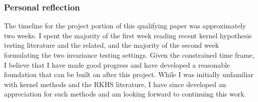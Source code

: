 \subsubsection*{Personal reflection}

The timeline for the project portion of this qualifying paper was approximately two weeks. I spent the majority of the first week reading recent kernel hypothesis testing literature and the related, and the majority of the second week formulating the two invariance testing settings. Given the constrained time frame, I believe that I have made good progress and have developed a reasonable foundation that can be built on after this project. While I was initially unfamiliar with kernel methods and the RKHS literature, I have since developed an appreciation for such methods and am looking forward to continuing this work.
